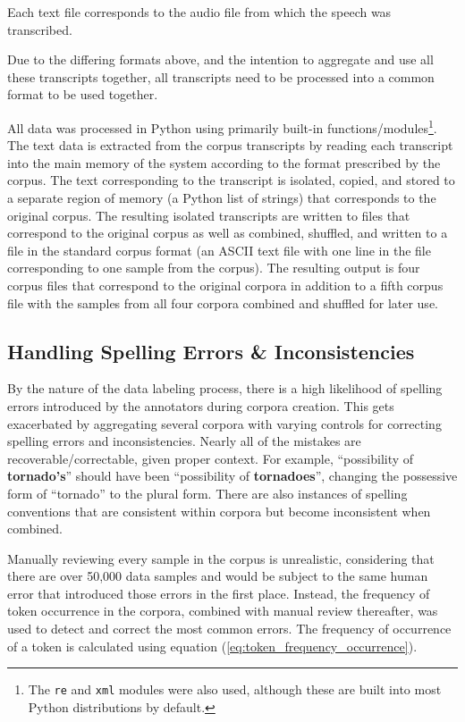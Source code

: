\documentclass[12pt]{article}
\begin{document}
\noindent
Each text file corresponds to the audio file from which the speech was transcribed.

Due to the differing formats above, and the intention to aggregate and use all these transcripts together, all transcripts need to be processed into
a common format to be used together.

All data was processed in Python using primarily built-in functions/modules\footnote{The \lstinline|re| and \lstinline|xml| modules were also used,
    although these are built into most Python distributions by default.}. The text data is extracted from the corpus transcripts by reading each
transcript into the main memory of the system according to the format prescribed by the corpus. The text corresponding to the transcript is isolated,
copied, and stored to a separate region of memory (a Python list of strings) that corresponds to the original corpus. The resulting isolated
transcripts are written to files that correspond to the original corpus as well as combined, shuffled, and written to a file in the standard corpus
format (an ASCII text file with one line in the file corresponding to one sample from the corpus). The resulting output is four corpus files that
correspond to the original corpora in addition to a fifth corpus file with the samples from all four corpora combined and shuffled for later use.

\subsection{Handling Spelling Errors \& Inconsistencies}\label{sec:spelling_errors}
By the nature of the data labeling process, there is a high likelihood of spelling errors introduced by the annotators during corpora creation. This
gets exacerbated by aggregating several corpora with varying controls for correcting spelling errors and inconsistencies. Nearly all of the mistakes
are recoverable/correctable, given proper context. For example, ``possibility of \textbf{tornado's}'' should have been ``possibility of
\textbf{tornadoes}'', changing the possessive form of ``tornado'' to the plural form. There are also instances of spelling conventions that are
consistent within corpora but become inconsistent when combined.

Manually reviewing every sample in the corpus is unrealistic, considering that there are over 50,000 data samples and would be subject to the same
human error that introduced those errors in the first place. Instead, the frequency of token occurrence in the corpora, combined with manual review
thereafter, was used to detect and correct the most common errors. The frequency of occurrence of a token is calculated using equation
(\ref{eq:token_frequency_occurrence}).
\end{document}
